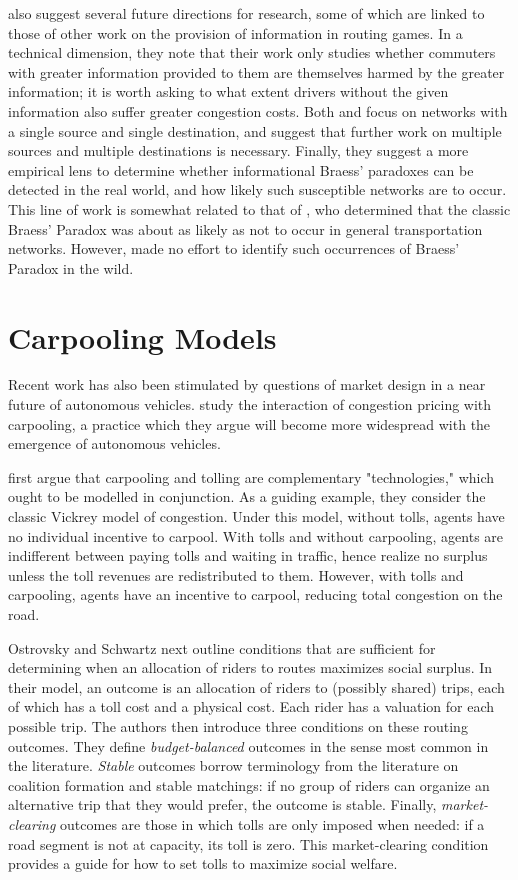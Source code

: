 \documentclass[JEL]{AEA}
\begin{document}
\cite{acemoglu-2016} also suggest several future directions for research, some of which are linked to those of other work on the provision of information in routing games. In a technical dimension, they note that their work only studies whether commuters with greater information provided to them are themselves harmed by the greater information; it is worth asking to what extent drivers without the given information also suffer greater congestion costs. Both \cite{das-2017} and \cite{acemoglu-2016} focus on networks with a single source and single destination, and suggest that further work on multiple sources and multiple destinations is necessary. Finally, they suggest a more empirical lens to determine whether informational Braess' paradoxes can be detected in the real world, and how likely such susceptible networks are to occur. This line of work is somewhat related to that of \cite{steinberg-1983}, who determined that the classic Braess' Paradox was about as likely as not to occur in general transportation networks. However, \cite{steinberg-1983} made no effort to identify such occurrences of Braess' Paradox in the wild.

\section{Carpooling Models}
\label{carpooling-models}

Recent work has also been stimulated by questions of market design in a near future of autonomous vehicles. \cite{ostrovsky-2018} study the interaction of congestion pricing with carpooling, a practice which they argue will become more widespread with the emergence of autonomous vehicles.

\cite{ostrovsky-2018} first argue that carpooling and tolling are complementary "technologies," which ought to be modelled in conjunction. As a guiding example, they consider the classic Vickrey model of congestion. Under this model, without tolls, agents have no individual incentive to carpool. With tolls and without carpooling, agents are indifferent between paying tolls and waiting in traffic, hence realize no surplus unless the toll revenues are redistributed to them. However, with tolls and carpooling, agents have an incentive to carpool, reducing total congestion on the road.

Ostrovsky and Schwartz next outline conditions that are sufficient for determining when an allocation of riders to routes maximizes social surplus. In their model, an outcome is an allocation of riders to (possibly shared) trips, each of which has a toll cost and a physical cost. Each rider has a valuation for each possible trip. The authors then introduce three conditions on these routing outcomes. They define \textit{budget-balanced} outcomes in the sense most common in the literature. \textit{Stable} outcomes borrow terminology from the literature on coalition formation and stable matchings: if no group of riders can organize an alternative trip that they would prefer, the outcome is stable. Finally, \textit{market-clearing} outcomes are those in which tolls are only imposed when needed: if a road segment is not at capacity, its toll is zero. This market-clearing condition provides a guide for how to set tolls to maximize social welfare. 
\end{document}
